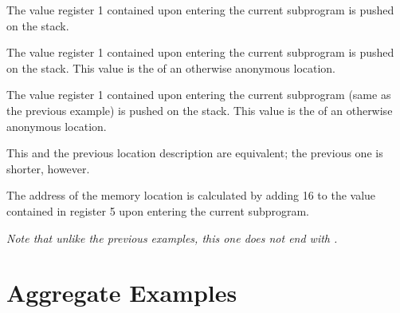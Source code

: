 \begin{description}
\descriptionitemnl{\DWOPentryvalue{} 1 \DWOPregone{} }
The value register 1 contained upon entering the current subprogram is 
pushed on the stack.

\descriptionitemnl{\DWOPentryvalue{} 1 \DWOPregone{} \DWOPstackvalue }
The value register 1 contained upon entering the current subprogram is 
pushed on the stack. This value is the
 of an otherwise anonymous location.

\descriptionitemnl{\DWOPentryvalue{} 2 \DWOPbregone{} 0 \DWOPstackvalue }
The value register 1 contained upon entering the current subprogram 
(same as the previous example) is pushed on the stack. This value is the
 of an otherwise anonymous location.

This and the previous location description are equivalent;
the previous one is shorter, however. 



\bb
{}
The address of the memory location is calculated by adding 16 to the value
contained in register 5 upon entering the current subprogram.

\textit{Note that unlike the previous \DWOPentryvalue{} examples, this one does not end
with \DWOPstackvalue.{}}
\eb

\end{description}

\section{Aggregate Examples}
\label{app:aggregateexamples}

